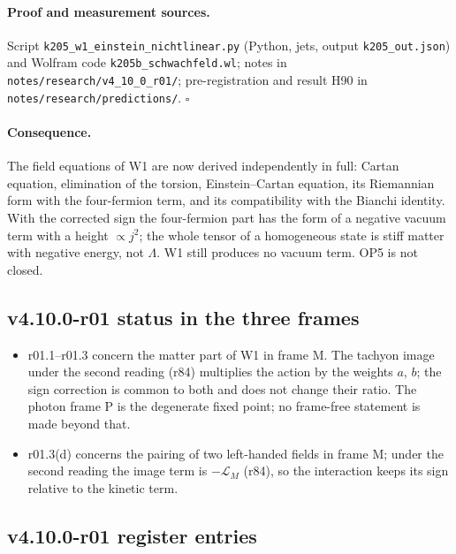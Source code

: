 \paragraph{Proof and measurement sources.}
Script \texttt{k205\_\allowbreak w1\_\allowbreak einstein\_\allowbreak nichtlinear.py} (Python, jets, output \texttt{k205\_\allowbreak out.json}) and Wolfram code
\texttt{k205b\_\allowbreak schwachfeld.wl}; notes in \texttt{notes/\allowbreak research/\allowbreak v4\_10\_0\_r01/}; pre-registration and result H90 in
\texttt{notes/\allowbreak research/\allowbreak predictions/}.  \(\square\)

\paragraph{Consequence.}
The field equations of W1 are now derived independently in full: Cartan equation, elimination of the torsion, Einstein--Cartan equation, its
Riemannian form with the four-fermion term, and its compatibility with the Bianchi identity.  With the corrected sign the four-fermion
part has the form of a negative vacuum term with a height \(\propto j^2\); the whole tensor of a homogeneous state is stiff matter with
negative energy, not \(\Lambda\).  W1 still produces no vacuum term.  OP5 is not closed.

\subsection*{v4.10.0-r01 status in the three frames}
\label{subsec:v4100-r01-frames}

\begin{itemize}[leftmargin=2em]
\item r01.1--r01.3 concern the matter part of W1 in frame M.  The tachyon image under the second reading (r84) multiplies the action by the
weights \(a\), \(b\); the sign correction is common to both and does not change their ratio.  The photon frame P is the degenerate fixed point;
no frame-free statement is made beyond that.
\item r01.3(d) concerns the pairing of two left-handed fields in frame M; under the second reading the image term is \(-\mathcal L_M\) (r84), so the
interaction keeps its sign relative to the kinetic term.
\end{itemize}

\subsection*{v4.10.0-r01 register entries}
\label{subsec:v4100-r01-register}

